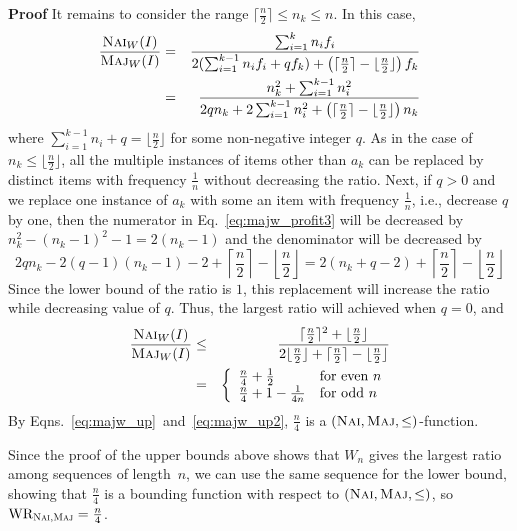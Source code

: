 \documentclass[11pt]{article}
\newenvironment{proof}{\begin{trivlist}\item[]{\bf Proof }}{\hspace*{\fill}\raisebox{-1pt}{\boldmath$\Box$}\end{trivlist}}
\newcommand{\maj}{{\ensuremath{\textsc{Maj}}}\xspace}
\newcommand{\nav}{{\ensuremath{\textsc{Nai}}}\xspace}
\DeclareMathOperator{\WR}{\textrm{WR}}
\begin{document}
\begin{proof}
It remains to consider the range $\lceil \frac{n}{2} \rceil \leq n_k \leq n$.
In this case,
\begin{eqnarray}
\frac{\nav_W(I)}{\maj_W(I)} &=& \frac{\sum_{i=1}^k n_if_i}{2(\sum_{i=1}^{k-1}n_if_i + qf_k) + \left (\lceil \frac{n}{2} \rceil - \lfloor \frac{n}{2} \rfloor \right) f_k} \nonumber
\\
&=& \frac{n_k^2 + \sum_{i=1}^{k-1} n_i^2}{2qn_k + 2\sum_{i=1}^{k-1}n_i^2 + \left (\lceil \frac{n}{2} \rceil - \lfloor \frac{n}{2} \rfloor \right) n_k} \label{eq:majw_profit3}
\end{eqnarray}
where $\sum_{i=1}^{k-1}n_i + q = \lfloor \frac{n}{2} \rfloor$ for some non-negative integer $q$.
As in the case of $n_k \leq \lfloor \frac{n}{2} \rfloor$, all the multiple instances of items other than $a_k$ can be replaced by distinct items with frequency $\frac{1}{n}$ without decreasing the ratio.
Next, if $q>0$ and we replace one instance of $a_k$ with some an item with frequency $\frac{1}{n}$, i.e., decrease $q$ by one, then the numerator in Eq.~\ref{eq:majw_profit3} will be decreased by $n_k^2 - (n_k-1)^2 - 1 = 2(n_k-1)$ and the denominator will be decreased by $$2qn_k - 2(q-1)(n_k-1)-2 +  \left\lceil \frac{n}{2} \right\rceil - \left\lfloor \frac{n}{2} \right\rfloor = 2(n_k + q -2) + \left\lceil \frac{n}{2} \right\rceil - \left\lfloor \frac{n}{2} \right\rfloor$$
Since the lower bound of the ratio is $1$, this replacement will increase the ratio while decreasing value of $q$.
Thus, the largest ratio will achieved when $q=0$, and
\begin{eqnarray}
\frac{\nav_W(I)}{\maj_W(I)} &\leq& \frac{\lceil \frac{n}{2} \rceil^2 + \lfloor \frac{n}{2}\rfloor}{2\lfloor \frac{n}{2}\rfloor  + \lceil \frac{n}{2} \rceil - \lfloor \frac{n}{2} \rfloor} \nonumber \\
& = & \left\{ \begin{array}{ll}
\frac{n}{4} + \frac{1}{2} & \mbox{for even $n$}\\
\frac{n}{4} + 1 - \frac{1}{4n} & \mbox{for odd $n$}
\end{array} \right. \label{eq:majw_up2}
\end{eqnarray}
By
Eqns.~\ref{eq:majw_up}~and~\ref{eq:majw_up2},
$\frac{n}{4}$ is a $(\nav,\maj,\leq)$-function.


Since the proof of the upper bounds above
shows that $W_n$ gives the largest ratio among sequences of length~$n$,
we can use the same sequence for the lower bound, showing that
$\frac{n}{4}$ is a bounding function with respect to $(\nav,\maj,\leq)$,
so $\WR_{\nav,\maj} = \frac{n}{4}$.


\end{proof}
\end{document}
